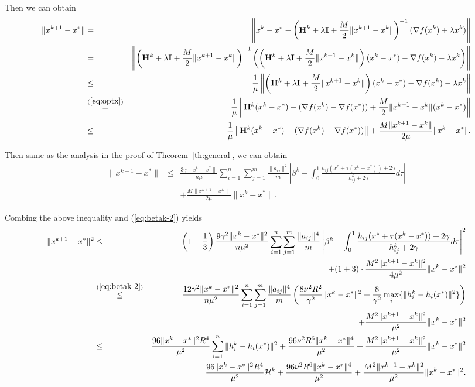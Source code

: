 \documentclass[10pt]{article}
\newcommand{\newalpha}{h}
\newcommand{\mH}{\mathbf{H}}
\newcommand{\mI}{\mathbf{I}}
\begin{document}
Then we can obtain 
\begin{eqnarray*}
	\|x^{k+1} - x^*\| &=& \left \| x^k - x^* - \left(\mH^k + \lambda \mI +  \frac{M}{2}\|x^{k+1} - x^k\| \right)^{-1} (\nabla f(x^k) + \lambda x^k) \right\| \\
	&=& \left\| \left(\mH^k + \lambda \mI + \frac{M}{2}\|x^{k+1} - x^k\| \right)^{-1} \left(  \left( \mH^k + \lambda \mI + \frac{M}{2}\|x^{k+1} - x^k\| \right) (x^k - x^*) - \nabla f(x^k) - \lambda x^k  \right) \right\| \\ 
	&\leq& \frac{1}{\mu}  \left\|  \left(\mH^k + \lambda \mI +  \frac{M}{2}\|x^{k+1} - x^k\| \right)(x^k - x^*) - \nabla f(x^k) - \lambda x^k  \right \| \\ 
	&\overset{(\ref{eq:optx})}{=}& \frac{1}{\mu} \left\| \mH^k (x^k - x^*) - (\nabla f(x^k) - \nabla f(x^*)) +  \frac{M}{2}\|x^{k+1} - x^k\|(x^k - x^*) \right\| \\ 
	&\leq& \frac{1}{\mu} \left\| \mH^k (x^k - x^*) - (\nabla f(x^k) - \nabla f(x^*)) \right\|  + \frac{M\|x^{k+1} - x^k\|}{2\mu} \| x^k - x^* \|. 
\end{eqnarray*}

Then same as the analysis in the proof of Theorem~\ref{th:general}, we can obtain 
\begin{eqnarray*}
	\|x^{k+1} - x^*\| &\leq& \frac{3\gamma\|x^k - x^*\|}{n \mu} \sum_{i=1}^n \sum_{j=1}^{m} \frac{\|a_{ij}\|^2}{m} \left|   \beta^k - \int_{0}^1 \frac{\newalpha_{ij}(x^* + \tau(x^k - x^*)) + 2\gamma}{ h_{ij}^k + 2\gamma} d\tau   \right| \\ 
	&& +  \frac{M\|x^{k+1} - x^k\|}{2\mu} \| x^k - x^* \|.
\end{eqnarray*}

Combing the above inequality and (\ref{eq:betak-2}) yields 
\begin{eqnarray*}
	\|x^{k+1} - x^*\|^2 &\leq& \left(  1 + \frac{1}{3}  \right) \frac{9\gamma^2 \|x^k - x^*\|^2}{n \mu^2} \sum_{i=1}^n \sum_{j=1}^{m} \frac{\|a_{ij}\|^4}{m} \left|   \beta^k - \int_{0}^1 \frac{\newalpha_{ij}(x^* + \tau(x^k - x^*)) + 2\gamma}{ h_{ij}^k + 2\gamma} d\tau   \right|^2 \\
	&& + (1 + 3) \cdot \frac{M^2\|x^{k+1} - x^k\|^2}{4\mu^2} \| x^k - x^* \|^2 \\
	&\overset{(\ref{eq:betak-2})}{\leq}& \frac{12 \gamma^2\|x^k - x^*\|^2}{n \mu^2} \sum_{i=1}^n \sum_{j=1}^{m} \frac{\|a_{ij}\|^4}{m} \left(  \frac{8\nu^2 R^2}{\gamma^2} \|x^k - x^*\|^2 + \frac{8}{\gamma^2} \max_{i} \{\|h_i^k - \newalpha_i(x^*)\|^2 \}    \right) \\ 
	&& +  \frac{M^2\|x^{k+1} - x^k\|^2}{\mu^2} \| x^k - x^* \|^2 \\ 
	&\leq&  \frac{96\|x^k - x^*\|^2 R^4}{\mu^2} \sum_{i=1}^n \|h_i^k - \newalpha_i(x^*)\|^2 +   \frac{96\nu^2 R^6\|x^k - x^*\|^4 }{\mu^2} +  \frac{M^2\|x^{k+1} - x^k\|^2}{\mu^2} \| x^k - x^* \|^2 \\ 
	&=&  \frac{96\|x^k - x^*\|^2 R^4}{\mu^2}{\cal H}^k  +   \frac{96\nu^2 R^6\|x^k - x^*\|^4 }{\mu^2} +  \frac{M^2\|x^{k+1} - x^k\|^2}{\mu^2} \| x^k - x^* \|^2. 
\end{eqnarray*}
\end{document}

